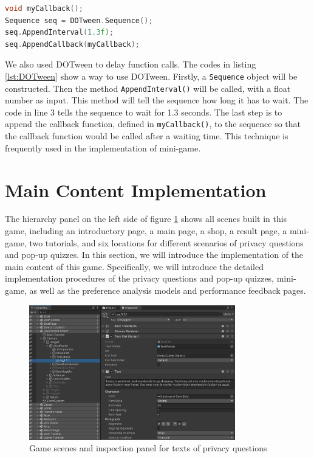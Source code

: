 \documentclass[msc,deptreport,ai]{infthesis}      %
\begin{document}
\begin{lstlisting}[caption={DOTween sequence},label={lst:DOTween},language=C++]
void myCallback();
Sequence seq = DOTween.Sequence();
seq.AppendInterval(1.3f);
seq.AppendCallback(myCallback);
\end{lstlisting}

We also used DOTween to delay function calls. The codes in listing \ref{lst:DOTween} show a way to use DOTween. Firstly, a \texttt{Sequence} object will be constructed. Then the method \texttt{AppendInterval()} will be called, with a float number as input. This method will tell the sequence how long it has to wait. The code in line 3 tells the sequence to wait for 1.3 seconds. The last step is to append the callback function, defined in \texttt{myCallback()}, to the sequence so that the callback function would be called after a waiting time. This technique is frequently used in the implementation of mini-game.

\section{Main Content Implementation}

The hierarchy panel on the left side of figure \ref{fig:Scene} shows all scenes built in this game, including an introductory page, a main page, a shop, a result page, a mini-game, two tutorials, and six locations for different scenarios of privacy questions and pop-up quizzes. In this section, we will introduce the implementation of the main content of this game. Specifically, we will introduce the detailed implementation procedures of the privacy questions and pop-up quizzes, mini-game, as well as the preference analysis models and performance feedback pages.

\begin{figure}[htbp]
    \centering
    \includegraphics[width=0.8\textwidth]{Scene.png}
    \caption{Game scenes and inspection panel for texts of privacy questions}
    \label{fig:Scene}
\end{figure}
\end{document}
